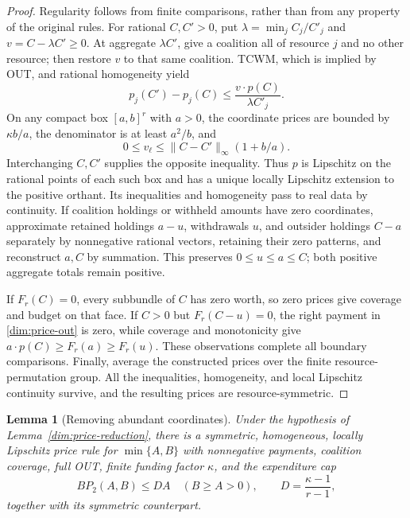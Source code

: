 \documentclass[11pt]{article}
\newtheorem{lemma}[theorem]{Lemma}
\theoremstyle{definition}\newtheorem{definition}[theorem]{Definition}
\theoremstyle{remark}\newtheorem{remark}[theorem]{Remark}
\begin{document}
\begin{proof}
Regularity follows from finite comparisons, rather than from any property
of the original rules. For rational $C,C'>0$, put
$\lambda=\min_j C_j/C'_j$ and $v=C-\lambda C'\ge0$.
At aggregate $\lambda C'$, give a coalition all of resource $j$ and no
other resource; then restore $v$ to that same coalition. TCWM, which is
implied by OUT, and rational homogeneity yield
\begin{equation}\label{dim:relative-comparison}
 p_j(C')-p_j(C)
 \le\frac{v\cdot p(C)}{\lambda C'_j}.
\end{equation}
On any compact box $[a,b]^r$ with $a>0$, the coordinate prices are bounded
by $\kappa b/a$, the denominator is at least $a^2/b$, and
\[
 0\le v_\ell\le\|C-C'\|_\infty(1+b/a).
\]
Interchanging $C,C'$ supplies the opposite inequality. Thus $p$ is
Lipschitz on the rational points of each such box and has a unique locally
Lipschitz extension to the positive orthant. Its inequalities and
homogeneity pass to real data by continuity. If coalition holdings or
withheld amounts have zero coordinates, approximate retained holdings $a-u$, withdrawals $u$, and outsider
holdings $C-a$ separately by nonnegative rational vectors, retaining their zero
patterns, and reconstruct $a,C$ by summation. This preserves
$0\le u\le a\le C$; both positive aggregate totals remain positive.

If $F_r(C)=0$, every subbundle of $C$ has zero worth, so zero prices give
coverage and budget on that face. If $C>0$ but $F_r(C-u)=0$, the right
payment in \eqref{dim:price-out} is zero, while coverage and monotonicity
give $a\cdot p(C)\ge F_r(a)\ge F_r(u)$.
These observations complete all boundary comparisons. Finally, average
the constructed prices over the finite resource-permutation group.
All the inequalities, homogeneity, and local Lipschitz continuity survive,
and the resulting prices are resource-symmetric.
\end{proof}

\begin{lemma}[Removing abundant coordinates]\label{dim:pair-limit}
Under the hypothesis of Lemma~\ref{dim:price-reduction}, there is a
symmetric, homogeneous, locally Lipschitz price rule for $\min\{A,B\}$
with nonnegative payments, coalition coverage, full OUT, finite funding
factor $\kappa$, and the expenditure cap
\begin{equation}\label{dim:pair-cap}
 B P_2(A,B)\le D A\quad(B\ge A>0),
 \qquad D=\frac{\kappa-1}{r-1},
\end{equation}
together with its symmetric counterpart.
\end{lemma}
\end{document}
